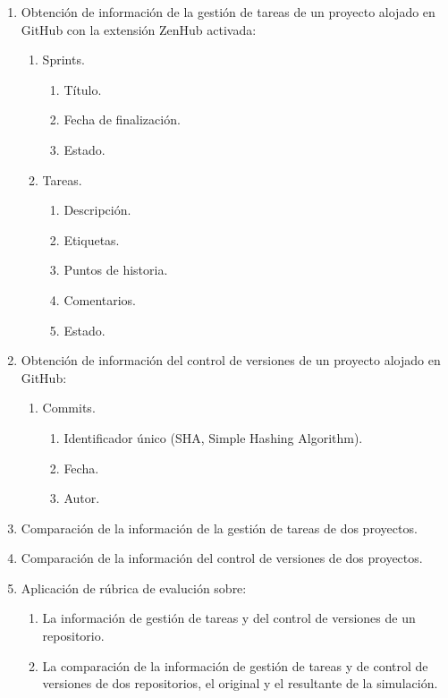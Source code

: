 \begin{enumerate}
	\item Obtención de información de la gestión de tareas de un proyecto alojado en GitHub con la extensión ZenHub activada:
	\begin{enumerate}
		\item Sprints.
		\begin{enumerate}
			\item Título. 
			\item Fecha de finalización.
			\item Estado.	
		\end{enumerate}	
		\item Tareas.	
		\begin{enumerate}
			\item Descripción. 
			\item Etiquetas.
			\item Puntos de historia.
			\item Comentarios.
			\item Estado.	
		\end{enumerate}	
	\end{enumerate}		
	\item Obtención de información del control de versiones de un proyecto alojado en GitHub:
	\begin{enumerate}
		\item Commits. 
			\begin{enumerate}
				\item Identificador único (SHA, Simple Hashing Algorithm). 
				\item Fecha.
				\item Autor.
			\end{enumerate}		
	\end{enumerate}
	\item Comparación de la información de la gestión de tareas de dos proyectos.
	\item Comparación de la información del control de versiones de dos proyectos.			
	\item Aplicación de rúbrica de evalución  sobre:
	\begin{enumerate}
		\item La información de gestión de tareas y del control de versiones de un repositorio. 
		\item La comparación de la información de gestión de tareas y de control de versiones de dos repositorios, el original y el resultante de la simulación.	
	\end{enumerate}			  
\end{enumerate}

